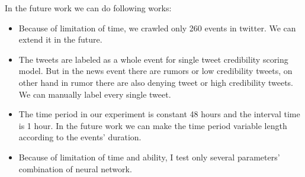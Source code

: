 In the future work we can do following works:
  \begin{itemize}
   \item Because of limitation of time, we crawled only 260 events in twitter. We can extend it in the future. 
	

 \item The tweets are labeled as a whole event for single tweet credibility scoring model. But in the news event there are rumors or low credibility tweets, on other hand in rumor there are also denying tweet or high credibility tweets. We can manually label every single tweet.
 \item The time period in our experiment is constant 48 hours and the interval time is 1 hour. In the future work we can make the time period variable length according to the events' duration. 
 \item Because of limitation of time and ability, I test only several parameters' combination of neural network.  
  \end{itemize}


